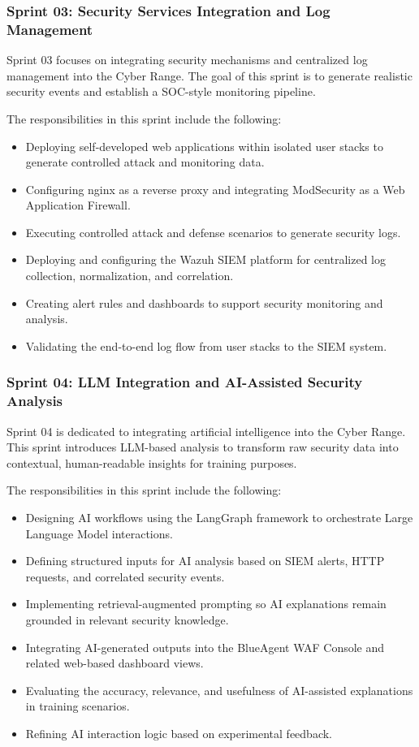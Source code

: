 \subsubsection{Sprint 03: Security Services Integration and Log Management}
Sprint 03 focuses on integrating security mechanisms and centralized log management into the Cyber Range. The goal of this sprint is to generate realistic security events and establish a SOC-style monitoring pipeline.

The responsibilities in this sprint include the following:
\begin{itemize}
		\item Deploying self-developed web applications within isolated user stacks to generate controlled attack and monitoring data.
	\item Configuring nginx as a reverse proxy and integrating ModSecurity as a Web Application Firewall.
	\item Executing controlled attack and defense scenarios to generate security logs.
	\item Deploying and configuring the Wazuh SIEM platform for centralized log collection, normalization, and correlation.
	\item Creating alert rules and dashboards to support security monitoring and analysis.
	\item Validating the end-to-end log flow from user stacks to the SIEM system.
\end{itemize}

\subsubsection{Sprint 04: LLM Integration and AI-Assisted Security Analysis}
Sprint 04 is dedicated to integrating artificial intelligence into the Cyber Range. This sprint introduces LLM-based analysis to transform raw security data into contextual, human-readable insights for training purposes.

The responsibilities in this sprint include the following:
\begin{itemize}
	\item Designing AI workflows using the LangGraph framework to orchestrate Large Language Model interactions.
	\item Defining structured inputs for AI analysis based on SIEM alerts, HTTP requests, and correlated security events.
	\item Implementing retrieval-augmented prompting so AI explanations remain grounded in relevant security knowledge.
	\item Integrating AI-generated outputs into the BlueAgent WAF Console and related web-based dashboard views.
	\item Evaluating the accuracy, relevance, and usefulness of AI-assisted explanations in training scenarios.
	\item Refining AI interaction logic based on experimental feedback.
\end{itemize}

